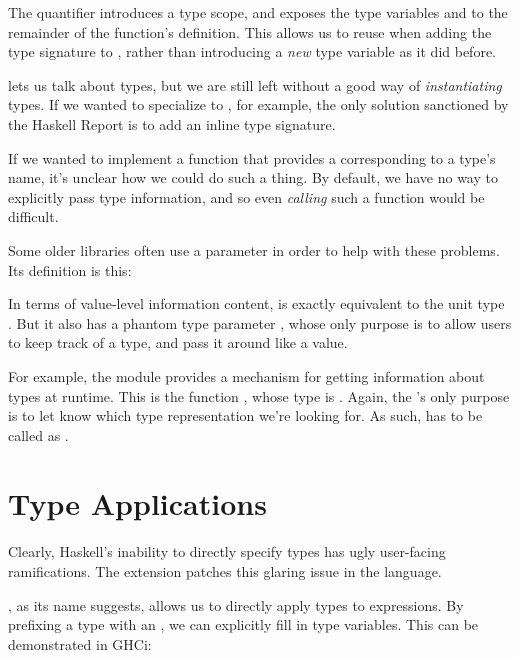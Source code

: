 \documentclass[book.tex]{subfiles}
\begin{document}

The  quantifier introduces a type scope, and exposes the type
variables  and  to the remainder of the function's definition. This
allows us to reuse  when adding the type signature to , rather
than introducing a \emph{new} type variable as it did before.

 lets us talk about types, but we are still left
without a good way of \emph{instantiating} types. If we wanted to specialize
 to , for example, the only solution sanctioned by the
Haskell Report is to add an inline type signature.

If we wanted to implement a function that provides a  corresponding
to a type's name, it's unclear how we could do such a thing. By default, we have
no way to explicitly pass type information, and so even \emph{calling} such a
function would be difficult.

Some older libraries often use a  parameter in order to help with
these problems. Its definition is this:


In terms of value-level information content,  is exactly equivalent to
the unit type \ty{()}. But it also has a \gls{phantom} type parameter ,
whose only purpose is to allow users to keep track of a type, and pass it around
like a value.

For example, the module  provides a mechanism for getting
information about types at runtime. This is the function , whose
type is . Again, the 's only
purpose is to let  know which type representation we're looking for.
As such,  has to be called as .


\section{Type Applications}

Clearly, Haskell's inability to directly specify types has ugly user-facing
ramifications. The extension  patches this glaring
issue in the language.

, as its name suggests, allows us to directly apply
types to expressions. By prefixing a type with an , we can explicitly fill
in type variables. This can be demonstrated in GHCi:
\end{document}
